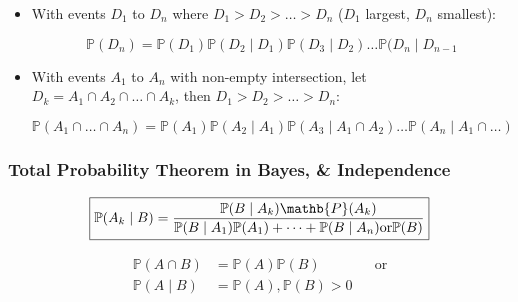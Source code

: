 \documentclass[10pt]{article}
\begin{document}
\begin{itemize}
\item With events $D_1$ to $D_n$ where $D_1 > D_2 > \dots > D_n$
  ($D_1$ largest, $D_n$ smallest):

  \begin{equation}
    \tag{Product Rule 1}
    \boxed{
      \mathbb{P}(D_n) = \mathbb{P}(D_1) \mathbb{P}(D_2 \mid D_1)
      \mathbb{P}(D_3 \mid D_2) \dots \mathbb{P}(D_n \mid D_{n-1}
    }
  \end{equation}

\item With events $A_1$ to $A_n$ with non-empty intersection, let
  $D_k = A_1 \cap A_2 \cap \dots \cap A_k$, then
  $D_1 > D_2 > \dots > D_n$:

  \begin{equation}
    \tag{Product Rule 2}
    \boxed{
      \mathbb{P}(A_1 \cap \dots \cap A_n) = \mathbb{P}(A_1)
      \mathbb{P}(A_2 \mid A_1) \mathbb{P}(A_3 \mid A_1 \cap A_2) \dots
      \mathbb{P}(A_n \mid A_1 \cap \dots)
    }
  \end{equation}
\end{itemize}


\subsubsection*{Total Probability Theorem in Bayes, \& Independence}


\begin{multicols}{2}

\begin{equation*}
  \boxed{
    \mathbb{P}(A_k \mid B) =
    \frac{\mathbb{P}(B \mid A_k) \mathb{P}(A_k)}
    {\mathbb{P}(B \mid A_1) \mathbb{P}(A_1) + \dots + \mathbb{P}(B
      \mid A_n) \text{or} \mathbb{P}(B)}
  }
\end{equation*}

\columnbreak

\begin{equation*}
  \boxed{
    \begin{aligned}
      \mathbb{P}(A \cap B)
      &= \mathbb{P}(A) \mathbb{P}(B)
      && \text{or} \\
      \mathbb{P}(A \mid B)
      &= \mathbb{P}(A), \mathbb{P}(B) > 0
    \end{aligned}
  }
\end{equation*}
\end{multicols}
\end{document}
